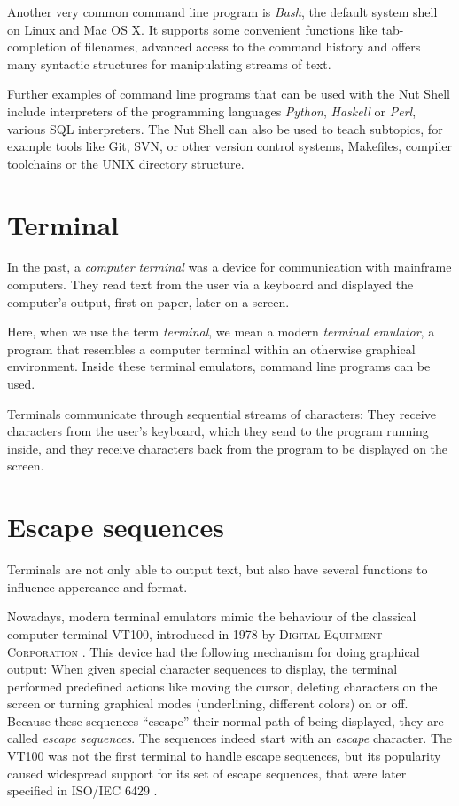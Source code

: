\documentclass[paper=a4,twoside,abstract=on,cleardoublepage=empty,numbers=noenddot,toc=bib,12pt,appendixprefix=true]{scrreprt}
\begin{document}
\label{sec:cliexamples}

Another very common command line program is \emph{Bash}, the default system shell on Linux and Mac OS X. It supports some convenient functions like tab-completion of filenames, advanced access to the command history and offers many syntactic structures for manipulating streams of text.

Further examples of command line programs that can be used with the Nut Shell include interpreters of the programming languages \emph{Python}, \emph{Haskell} or \emph{Perl}, various SQL interpreters. The Nut Shell can also be used to teach subtopics, for example tools like Git, SVN, or other version control systems, Makefiles, compiler toolchains or the UNIX directory structure.

\section{Terminal}

In the past, a \emph{computer terminal} was a device for communication with mainframe computers. They read text from the user via a keyboard and displayed the computer's output, first on paper, later on a screen.

Here, when we use the term \emph{terminal}, we mean a modern \emph{terminal emulator}, a program that resembles a computer terminal within an otherwise graphical environment. Inside these terminal emulators, command line programs can be used.

Terminals communicate through sequential streams of characters: They receive characters from the user's keyboard, which they send to the program running inside, and they receive characters back from the program to be displayed on the screen.

\section{Escape sequences}

Terminals are not only able to output text, but also have several functions to influence appereance and format.

Nowadays, modern terminal emulators mimic the behaviour of the classical computer terminal \textsc{VT100}, introduced in 1978 by \textsc{Digital Equipment Corporation} \cite{upt02}. This device had the following mechanism for doing graphical output: When given special character sequences to display, the terminal performed predefined actions like moving the cursor, deleting characters on the screen or turning graphical modes (underlining, different colors) on or off. Because these sequences “escape” their normal path of being displayed, they are called \emph{escape sequences}. The sequences indeed start with an \emph{escape} character. The VT100 was not the first terminal to handle escape sequences, but its popularity caused widespread support for its set of escape sequences, that were later specified in ISO/IEC 6429 \cite{iso6429}.
\end{document}

